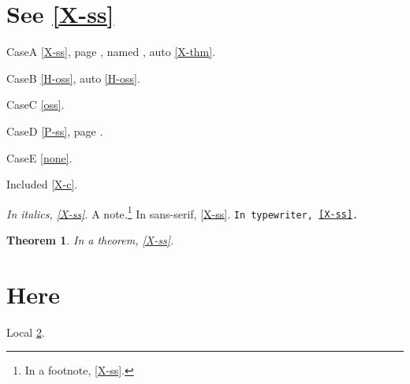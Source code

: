 \documentclass{article}
\newtheorem{theorem}{Theorem}
\begin{document}
\section{See \ref{X-ss}}
CaseA \ref{X-ss}, page \pageref{X-front}, named ,
auto \autoref{X-thm}.

CaseB \ref{H-oss}, auto \autoref{H-oss}.

CaseC \ref{oss}.

CaseD \ref{P-ss}, page \pageref{P-front}.

CaseE \ref{none}.

Included \ref{X-c}.

\textit{In italics, \ref{X-ss}.}
A note.\footnote{In a footnote, \ref{X-ss}.}
\textsf{In sans-serif, \ref{X-ss}.}
\texttt{In typewriter, \ref{X-ss}.}

\begin{theorem}
In a theorem, \ref{X-ss}.
\end{theorem}

\section{Here}\label{here}
Local \ref{here}.
\end{document}
